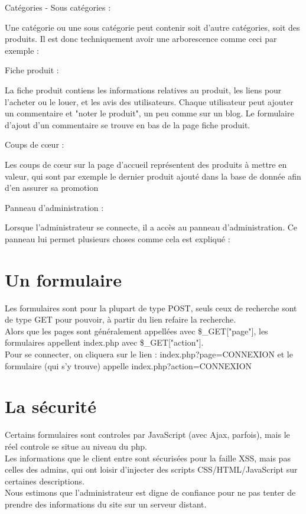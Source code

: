 \documentclass[10pt,a4paper]{article}
\begin{document}
	Catégories - Sous catégories :

	Une catégorie ou une sous catégorie peut contenir soit d'autre catégories, 	soit des produits. Il est donc techniquement avoir une arborescence comme ceci par exemple :
				
	Fiche produit :

	La fiche produit contiens les informations relatives au produit, les liens pour l'acheter ou le louer, et les avis des utilisateurs.
Chaque utilisateur peut ajouter un commentaire et "noter le produit", un peu comme sur un blog. Le formulaire d'ajout d'un commentaire se trouve en
bas de la page fiche produit. 
		
	Coups de cœur :

	Les coups de cœur sur la page d'accueil représentent des produits à mettre en valeur, qui sont par exemple le dernier produit ajouté dans la base de donnée afin d'en assurer sa promotion
		
	Panneau d'administration :

	Lorsque l'administrateur se connecte, il a accès au panneau d'administration. Ce panneau lui permet plusieurs choses comme cela est expliqué :
			
			
		\section{Un formulaire}
			Les formulaires sont pour la plupart de type POST, seuls ceux de recherche sont de type GET pour pouvoir, à partir du lien refaire la recherche.\\
			Alors que les pages sont généralement appellées avec \$\_GET["page"], les formulaires appellent index.php avec \$\_GET["action"].\\
			Pour se connecter, on cliquera sur le lien : index.php?page=CONNEXION et le formulaire (qui s'y trouve) appelle index.php?action=CONNEXION
		\section{La sécurité}
			Certains formulaires sont controles par JavaScript (avec Ajax, parfois), mais le réel controle se situe au niveau du php.\\
			Les informations que le client entre sont sécurisées pour la faille XSS, mais pas celles des admins, qui ont loisir d'injecter des scripts CSS/HTML/JavaScript sur certaines descriptions.\\
			Nous estimons que l'administrateur est digne de confiance pour ne pas tenter de prendre des informations du site sur un serveur distant.
	\newpage
\end{document}
